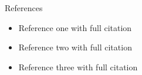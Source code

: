 \documentclass[aspectratio=169, xcolor=table]{beamer}
\begin{document}
\appendix

\begin{frame}[allowframebreaks]{References}
	\small
	\begin{itemize}
		\item Reference one with full citation
		\item Reference two with full citation
		\item Reference three with full citation
	\end{itemize}

\end{frame}
\end{document}
